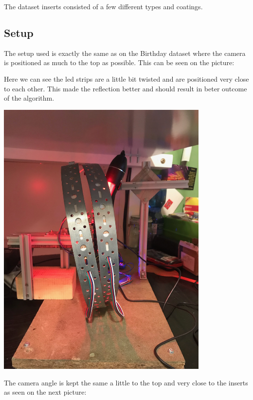 \documentclass{article}
\begin{document}
The dataset inserts consisted of a few different types and coatings. 



\subsection{Setup}

The setup used is exactly the same as on the Birthday dataset where the camera is positioned as much to the top as possible. This can be seen on the picture:

Here we can see the led strips are a little bit twisted and are positioned very close to each other. This made the reflection better and should result in beter outcome of the algorithm.



\includegraphics[width=4.166667in, keepaspectratio=true]{./ZimFiles_files/Vision/Dataset/automated_datasets/2_created_datasets/2_Spaghetti_dataset/IMG_9295.jpeg}



The camera angle is kept the same a little to the top and very close to the inserts as seen on the next picture:
\end{document}
